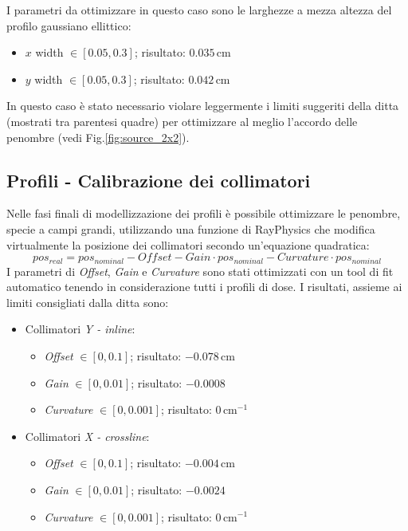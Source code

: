 I parametri da ottimizzare in questo caso sono le larghezze a mezza altezza del profilo gaussiano ellittico:
\begin{itemize}
\item $x$ width $\in [0.05,0.3]$; risultato: $0.035\,$cm
\item $y$ width $\in [0.05,0.3]$; risultato: $0.042\,$cm
\end{itemize}
In questo caso è stato necessario violare leggermente i limiti suggeriti della ditta (mostrati tra parentesi quadre) per ottimizzare al meglio l'accordo delle penombre (vedi Fig.\ref{fig:source_2x2}).

\subsection{Profili - Calibrazione dei collimatori}
Nelle fasi finali di modellizzazione dei profili è possibile ottimizzare le penombre, specie a campi grandi, utilizzando una funzione di RayPhysics che modifica virtualmente la posizione dei collimatori secondo un'equazione quadratica:
\begin{equation}
pos_{real} = pos_{nominal} - Offset - Gain\cdot pos_{nominal} - Curvature \cdot pos_{nominal}
\label{eq:offset}
\end{equation}
I parametri di \textit{Offset}, \textit{Gain} e \textit{Curvature} sono stati ottimizzati con un tool di fit automatico tenendo in considerazione tutti i profili di dose. I risultati, assieme ai limiti consigliati dalla ditta sono:
\begin{itemize}
\item Collimatori \textit{Y - inline}:
\begin{itemize}
\item \textit{Offset} $\in [0,0.1]$; risultato: $-0.078\,$cm
\item \textit{Gain} $\in [0,0.01]$; risultato: $-0.0008\,$
\item \textit{Curvature} $\in [0,0.001]$; risultato: $0\,$cm$^{-1}$
\end{itemize}
\item Collimatori \textit{X - crossline}:
\begin{itemize}
\item \textit{Offset} $\in [0,0.1]$; risultato: $-0.004\,$cm
\item \textit{Gain} $\in [0,0.01]$; risultato: $-0.0024\,$
\item \textit{Curvature} $\in [0,0.001]$; risultato: $0\,$cm$^{-1}$
\end{itemize}
\end{itemize}

